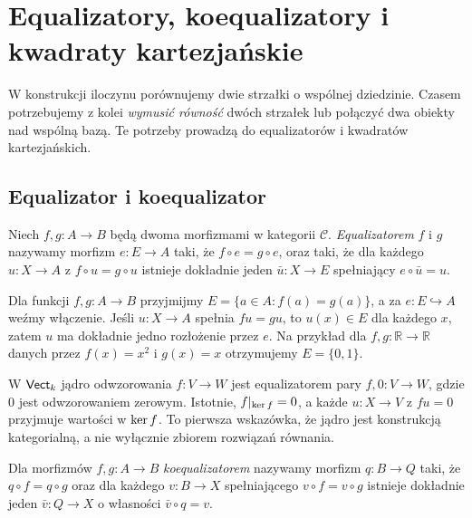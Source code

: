 \section{Equalizatory, koequalizatory i kwadraty kartezjańskie}\label{sec:equalizatory}

W konstrukcji iloczynu porównujemy dwie strzałki o wspólnej dziedzinie. Czasem potrzebujemy z kolei \emph{wymusić równość} dwóch strzałek lub połączyć dwa obiekty nad wspólną bazą. Te potrzeby prowadzą do equalizatorów i kwadratów kartezjańskich.

\subsection{Equalizator i koequalizator}

\begin{definicja}[Equalizator]\label{def:equalizer}
Niech $f,g:A\to B$ będą dwoma morfizmami w kategorii $\mathcal C$. \emph{Equalizatorem} $f$ i $g$ nazywamy morfizm $e:E\to A$ taki, że $f\circ e=g\circ e$, oraz taki, że dla każdego $u:X\to A$ z $f\circ u=g\circ u$ istnieje dokładnie jeden $\bar u:X\to E$ spełniający $e\circ\bar u=u$.
\end{definicja}

\begin{przyklad}
Dla funkcji $f,g:A\to B$ przyjmijmy $E=\{a\in A:f(a)=g(a)\}$, a za $e:E\hookrightarrow A$ weźmy włączenie. Jeśli $u:X\to A$ spełnia $fu=gu$, to $u(x)\in E$ dla każdego $x$, zatem $u$ ma dokładnie jedno rozłożenie przez $e$. Na przykład dla $f,g:\mathbb R\to\mathbb R$ danych przez $f(x)=x^2$ i $g(x)=x$ otrzymujemy $E=\{0,1\}$.
\end{przyklad}

\begin{przyklad}
W $\mathsf{Vect}_k$ jądro odwzorowania $f:V\to W$ jest equalizatorem pary $f,0:V\to W$, gdzie $0$ jest odwzorowaniem zerowym. Istotnie, $f|_{\operatorname{ker} f}=0$, a każde $u:X\to V$ z $fu=0$ przyjmuje wartości w $\operatorname{ker} f$. To pierwsza wskazówka, że jądro jest konstrukcją kategorialną, a nie wyłącznie zbiorem rozwiązań równania.
\end{przyklad}

\begin{definicja}[Koequalizator]\label{def:coeq}
Dla morfizmów $f,g:A\to B$ \emph{koequalizatorem} nazywamy morfizm $q:B\to Q$ taki, że $q\circ f=q\circ g$ oraz dla każdego $v:B\to X$ spełniającego $v\circ f=v\circ g$ istnieje dokładnie jeden $\bar v:Q\to X$ o własności $\bar v\circ q=v$.
\end{definicja}


